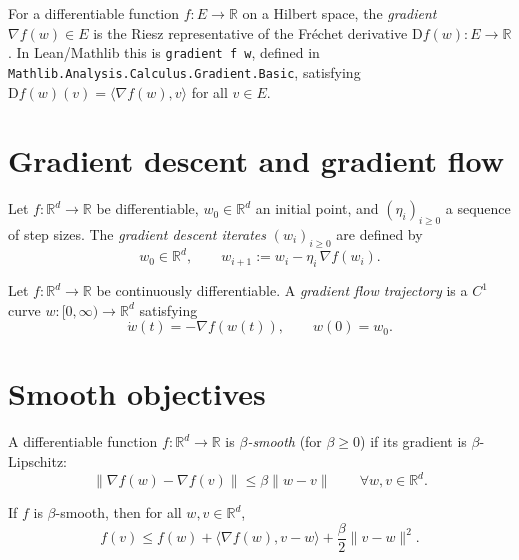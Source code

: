 \begin{remark}
  For a differentiable function $f : E \to \mathbb{R}$ on a Hilbert space, the \emph{gradient} $\nabla f(w) \in E$ is the Riesz representative of the Fréchet derivative $\mathrm{D}f(w) : E \to \mathbb{R}$.
  In Lean/Mathlib this is \texttt{gradient f w}, defined in \texttt{Mathlib.Analysis.Calculus.Gradient.Basic}, satisfying $\mathrm{D}f(w)(v) = \langle \nabla f(w), v \rangle$ for all $v \in E$.
\end{remark}


\section{Gradient descent and gradient flow}
\label{sec:gd-gf-def}

\begin{definition}\label{def:gdIterate}
  \leanok
Let $f : \mathbb{R}^d \to \mathbb{R}$ be differentiable, $w_0 \in \mathbb{R}^d$ an initial point, and $(\eta_i)_{i \ge 0}$ a sequence of step sizes.
The \emph{gradient descent iterates} $(w_i)_{i \ge 0}$ are defined by
\[
  w_0 \in \mathbb{R}^d, \qquad w_{i+1} := w_i - \eta_i \, \nabla f(w_i).
\]
\end{definition}

\begin{definition}\label{def:gfTrajectory}
Let $f : \mathbb{R}^d \to \mathbb{R}$ be continuously differentiable.
A \emph{gradient flow trajectory} is a $C^1$ curve $w : [0, \infty) \to \mathbb{R}^d$ satisfying
\[
  \dot{w}(t) = -\nabla f(w(t)), \qquad w(0) = w_0.
\]
\end{definition}


\section{Smooth objectives}
\label{sec:smoothness}

\begin{definition}\label{def:betaSmooth}
  \leanok
A differentiable function $f : \mathbb{R}^d \to \mathbb{R}$ is \emph{$\beta$-smooth} (for $\beta \ge 0$) if its gradient is $\beta$-Lipschitz:
\[
  \|\nabla f(w) - \nabla f(v)\| \le \beta \|w - v\| \qquad \forall w, v \in \mathbb{R}^d.
\]
\end{definition}

\begin{lemma}\label{lem:smoothUpperBound}
  \leanok
If $f$ is $\beta$-smooth, then for all $w, v \in \mathbb{R}^d$,
\[
  f(v) \le f(w) + \langle \nabla f(w), v - w \rangle + \frac{\beta}{2} \|v - w\|^2.
\]
\end{lemma}

